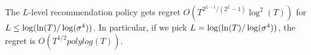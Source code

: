 \begin{comment}
   
   \draw[dashed] (0+0.4,6)--(6.4,7.5);  	
   \draw[dashed] (3+0.4,6)--(6.4,7.5);  	
  \node at (6,1.5)[rotate = 90]{$\cdots$};
  \node at (-1,1.5)[rotate = 90]{$\cdots$};
  \node at (6,9.5)[rotate = 90]{$\cdots$};
  \node at (-1,9.5)[rotate = 90]{$\cdots$};
  \node at(-1.2,0.5){\textbf{Level 1}};
  \node at(-1.2,3){\textbf{Level $l-2$}};
  \node at(-1.2,5.5){\textbf{Level $l-1$}};
  \node at(-1.2,8){\textbf{Level $l$}};
  \node at(-1.2,10.5){\textbf{Level $L$}};
  \draw[->] (13.3,0)--(13.3,12);
  \node at(13.7,6)[ rotate=90]{Time};
  \draw [rounded corners=5mm, line width=1mm, red](-0.2,1.75)--(12,1.75)--(12,9)--(-0.2,9)--cycle;\draw [rounded corners=2.5mm, line width=0.5mm, brown](5.9,6.5)--(8.9,6.5)--(8.9,8.8)--(5.9,8.8)--cycle;
\end{tikzpicture}
\caption{$l$-level Recommendation Policy.}
\label{fig:llevel}
\end{figure}
\end{comment}

\begin{theorem}
\label{thm:llevel}
The $L$-level recommendation policy gets regret $O\left(T^{2^{L-1}/(2^L-1)} \log^2(T) \right)$ for \\ $L \leq \log(\ln(T)/\log(\sigma^4))$. In particular, if we pick $L = \log(\ln(T)/\log(\sigma^4))$, the regret is $O(T^{1/2} polylog(T))$. 
\end{theorem}

